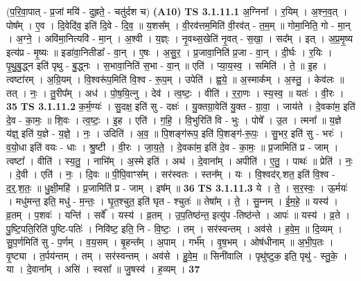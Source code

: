 \documentclass[17pt]{extarticle}
\begin{document}
                  \newline
                      (प॒रि॒वा॒पात् - प्र॒जां मयि॑ - दुह्रते॒ - चतु॑र्दश च)  \textbf{(A10)} \newline \newline
                                \textbf{ TS 3.1.11.1} \newline
                  अ॒ग्निना᳚ । र॒यिम् । अ॒श्न॒व॒त् । पोष᳚म् । ए॒व । दि॒वेदि॑व॒ इति॑ दि॒वे - दि॒व॒ ॥ य॒शस᳚म् । वी॒रव॑त्तम॒मिति॑ वी॒रव॑त् - त॒म॒म् ॥ गोमा॒निति॒ गो - मा॒न् । अ॒ग्ने॒ । अवि॑मा॒नित्यवि॑ - मा॒न् । अ॒श्वी । य॒ज्ञ्ः । नृ॒वथ्स॒खेति॑ नृ॒वत् - स॒खा॒ । सद᳚म् । इत् । अ॒प्र॒मृ॒ष्य इत्य॑प्र - मृ॒ष्यः ॥ इडा॑वा॒नितीडा᳚ - वा॒न् । ए॒षः । अ॒सु॒र॒ । प्र॒जावा॒निति॑ प्र॒जा - वा॒न् । दी॒र्घः । र॒यिः । पृ॒थु॒बु॒द्ध्न इति॑ पृथु - बु॒द्ध्नः । स॒भावा॒निति॑ स॒भा - वा॒न् ॥ एति॑ । प्या॒य॒स्व॒ । समिति॑ । ते॒ ॥ इ॒ह । त्वष्टा॑रम् । अ॒ग्रि॒यम् । वि॒श्वरू॑प॒मिति॑ वि॒श्व - रू॒प॒म् । उपेति॑ । ह्व॒ये॒ ॥ अ॒स्माक᳚म् । अ॒स्तु॒ । केव॑लः ॥ तत् । नः॒ । तु॒रीप᳚म् । अध॑ । पो॒ष॒यि॒त्नु । देव॑ । त्व॒ष्टः॒ । वीति॑ । र॒रा॒णः । स्य॒स्व॒ ॥ यतः॑ । वी॒रः । \textbf{  35} \newline
                  \newline
                                \textbf{ TS 3.1.11.2} \newline
                  क॒र्म॒ण्यः॑ । सु॒दक्ष॒ इति॑ सु - दक्षः॑ । यु॒क्तग्रा॒वेति॑ यु॒क्त - ग्रा॒वा॒ । जाय॑ते । दे॒वका॑म॒ इति॑ दे॒व - का॒मः॒ ॥ शि॒वः । त्व॒ष्टः॒ । इ॒ह । एति॑ । ग॒हि॒ । वि॒भुरिति॑ वि - भुः । पोषे᳚ । उ॒त । त्मना᳚ ॥ य॒ज्ञे य॑ज्ञ्॒ इति॑ य॒ज्ञे - य॒ज्ञे॒ । नः॒ । उदिति॑ । अ॒व॒ ॥ पि॒शङ्ग॑रूप॒ इति॑ पि॒शङ्ग॑-रू॒पः॒ । सु॒भर॒ इति॑ सु - भरः॑ । व॒यो॒धा इति॑ वयः - धाः । श्रु॒ष्टी । वी॒रः । जा॒य॒ते॒ । दे॒वका॑म॒ इति॑ दे॒व - का॒मः॒ ॥ प्र॒जामिति॑ प्र - जाम् । त्वष्टा᳚ । वीति॑ । स्य॒तु॒ । नाभि᳚म् । अ॒स्मे इति॑ । अथ॑ । दे॒वाना᳚म् । अपीति॑ । ए॒तु॒ । पाथः॑ ॥ प्रेति॑ । नः॒ । दे॒वी । एति॑ । नः॒ । दि॒वः ॥ पी॒पि॒वाꣳस᳚म् । सर॑स्वतः । स्तन᳚म् । यः । वि॒श्वद॑र्.शत॒ इति॑ वि॒श्व - द॒र्॒.श॒तः॒ ॥ धु॒क्षी॒महि॑ । प्र॒जामिति॑ प्र - जाम् । इष᳚म् ॥ \textbf{  36} \newline
                  \newline
                                \textbf{ TS 3.1.11.3} \newline
                  ये । ते॒ । स॒र॒स्वः॒ । ऊ॒र्मयः॑ । मधु॑मन्त॒ इति॒ मधु॑ - म॒न्तः॒ । घृ॒त॒श्चुत॒ इति॑ घृत - श्चुतः॑ ॥ तेषा᳚म् । ते॒ । सु॒म्नम् । ई॒म॒हे॒ ॥ यस्य॑ । व्र॒तम् । प॒शवः॑ । यन्ति॑ । सर्वे᳚ । यस्य॑ । व्र॒तम् । उ॒प॒तिष्ठ॑न्त॒ इत्यु॑प -तिष्ठ॑न्ते । आपः॑ ॥ यस्य॑ । व्र॒ते । पु॒ष्टि॒पति॒रिति॑ पुष्टि-पतिः॑ । निवि॑ष्ट॒ इति॒ नि - वि॒ष्टः॒ । तम् । सर॑स्वन्तम् । अव॑से । ह॒वे॒म॒ ॥ दि॒व्यम् । सु॒प॒र्णमिति॑ सु - प॒र्णम् । व॒य॒सम् । बृ॒हन्त᳚म् । अ॒पाम् । गर्भ᳚म् । वृ॒ष॒भम् । ओष॑धीनाम् ॥ अ॒भी॒प॒तः । वृ॒ष्ट्या । त॒र्पय॑न्तम् । तम् । सर॑स्वन्तम् । अव॑से । हु॒वे॒म॒ ॥ सिनी॑वालि । पृथु॑ष्टुक॒ इति॒ पृथु॑ - स्तु॒के॒ । या । दे॒वाना᳚म् । असि॑ । स्वसा᳚ ॥ जु॒षस्व॑ । ह॒व्यम् । \textbf{  37} \newline
\end{document}

